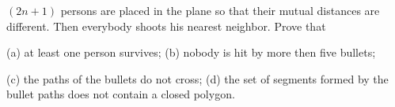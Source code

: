 $(2n + 1)$ persons are placed in the plane so that their mutual distances are different. Then everybody shoots his nearest neighbor. Prove that

(a) at least one person survives; (b) nobody is hit by more then five bullets;

(c) the paths of the bullets do not cross; (d) the set of segments formed by the bullet paths does not contain a closed polygon.
